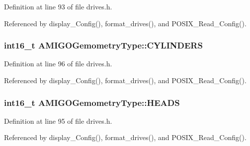Definition at line 93 of file drives.\+h.



Referenced by display\+\_\+\+Config(), format\+\_\+drives(), and P\+O\+S\+I\+X\+\_\+\+Read\+\_\+\+Config().

\subsubsection[{\texorpdfstring{C\+Y\+L\+I\+N\+D\+E\+RS}{CYLINDERS}}]{\setlength{\rightskip}{0pt plus 5cm}int16\+\_\+t A\+M\+I\+G\+O\+Gemometry\+Type\+::\+C\+Y\+L\+I\+N\+D\+E\+RS}\hypertarget{structAMIGOGemometryType_a4282aeb6c4aac3b8cfc09e29402dcd3f}{}\label{structAMIGOGemometryType_a4282aeb6c4aac3b8cfc09e29402dcd3f}


Definition at line 96 of file drives.\+h.



Referenced by display\+\_\+\+Config(), format\+\_\+drives(), and P\+O\+S\+I\+X\+\_\+\+Read\+\_\+\+Config().

\subsubsection[{\texorpdfstring{H\+E\+A\+DS}{HEADS}}]{\setlength{\rightskip}{0pt plus 5cm}int16\+\_\+t A\+M\+I\+G\+O\+Gemometry\+Type\+::\+H\+E\+A\+DS}\hypertarget{structAMIGOGemometryType_a33131d3948935e2064af9af151653033}{}\label{structAMIGOGemometryType_a33131d3948935e2064af9af151653033}


Definition at line 95 of file drives.\+h.



Referenced by display\+\_\+\+Config(), format\+\_\+drives(), and P\+O\+S\+I\+X\+\_\+\+Read\+\_\+\+Config().

